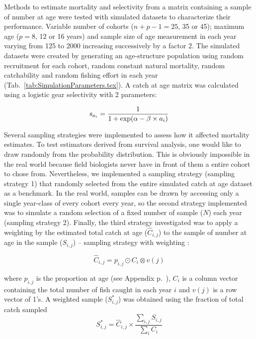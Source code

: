 Methods to estimate mortality and selectivity from a matrix containing a sample of number at age were tested with simulated datasets to characterize their performance. Variable number of cohorts ($n+p-1 = 25$, 35 or 45); maximum age ($p=8$, 12 or 16 years) and sample size of age measurement in each year varying from 125 to 2000 increasing successively by a factor 2. The simulated datasets were created by generating an age-structure population using random recruitment for each cohort, random constant natural mortality, random catchability and random fishing effort in each year (Tab.~\ref{tab:SimulationParameters.tex}). A catch at age matrix was calculated using a logistic gear selectivity with 2 parameters: 

\begin{equation}
s_{a_{i}} = \frac{1}{1  + {\rm exp}( \alpha - \beta \times a_{i})}
\end{equation}

Several sampling strategies were implemented to assess how it affected mortality estimates. To test estimators derived from survival analysis, one would like to draw randomly from the probability distribution. This is obviously impossible in the real world because field biologists never have in front of them a entire cohort to chose from. Nevertheless, we implemented a sampling strategy (sampling strategy 1) that randomly selected from the entire simulated catch at age dataset as a benchmark. In the real world, samples can be drawn by accessing only a single year-class of every cohort every year, so the second strategy implemented was to simulate a random selection of a fixed number of sample ($N$) each year (sampling strategy 2). Finally, the third strategy investigated was to apply a weighting by the estimated total catch at age ($\hat{C}_{i,j}$) to the sample of number at age in the sample ($S_{i,j}$) -- sampling strategy with weighting :

\begin{equation}
\hat{C}_{i,j} = p_{i,j} \odot C_{i} \otimes v(j)
\end{equation}

\noindent where $p_{i,j}$ is the proportion at age (see Appendix p.~\pageref{Appendix:DefinitionsOfMathematicalSymbols}), $C_{i}$ is a column vector containing the total number of fish caught in each year $i$ and $v(j)$ is a row vector of 1's. A weighted sample ($S^{*}_{i,j}$) was obtained using the fraction of total catch sampled
\begin{equation}
S^{*}_{i,j} = \hat{C}_{i,j} \times \frac{\sum_{i,j} S_{i,j}}{\sum_{i} C_{i}}
\end{equation}

